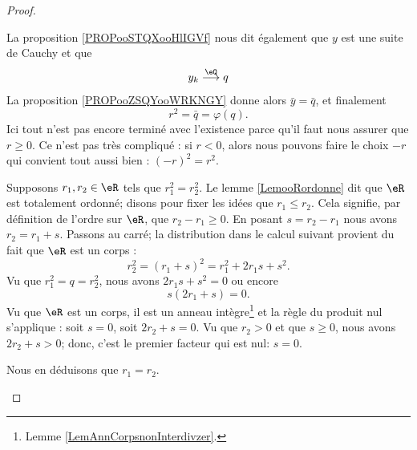 \begin{proof}
\begin{subproof}
            La proposition \ref{PROPooSTQXooHlIGVf} nous dit également que \( y\) est une suite de Cauchy et que
            \begin{equation}
                y_k\stackrel{\eQ}{\longrightarrow}q
            \end{equation}
            La proposition \ref{PROPooZSQYooWRKNGY} donne alors \( \bar y=\bar q\), et finalement
            \begin{equation}
                r^2=\bar q=\varphi(q).
            \end{equation}
            Ici tout n'est pas encore terminé avec l'existence parce qu'il faut nous assurer que \( r\geq 0\). Ce n'est pas très compliqué : si \( r<0\), alors nous pouvons faire le choix \( -r\) qui convient tout aussi bien : \( (-r)^2=r^2\).
        \item[Unicité]
            Supposons \( r_1,r_2\in \eR\) tels que \( r_1^2=r_2^2\). Le lemme \ref{LemooRordonne} dit que \( \eR\) est totalement ordonné; disons pour fixer les idées que \( r_1\leq r_2\). Cela signifie, par définition de l'ordre sur \( \eR\), que \( r_2-r_1\geq 0\). En posant \( s=r_2-r_1\) nous avons \( r_2=r_1+s\). Passons au carré; la distribution dans le calcul suivant provient du fait que \( \eR\) est un corps :
            \begin{equation}
                r_2^2=(r_1+s)^2=r_1^2+2r_1s+s^2.
            \end{equation}
            Vu que \( r_1^2=q=r_2^2\), nous avons \( 2r_1s+s^2=0\) ou encore
            \begin{equation}
                s(2r_1+s)=0.
            \end{equation}
            Vu que \( \eR\) est un corps, il est un anneau intègre\footnote{Lemme \ref{LemAnnCorpsnonInterdivzer}.} et la règle du produit nul s'applique : soit \( s=0\), soit \( 2r_2+s=0\). Vu que \( r_2>0\) et que \( s\geq 0\), nous avons \( 2r_2+s>0\); donc, c'est le premier facteur qui est nul: \( s=0\). 

            Nous en déduisons que \( r_1=r_2\).
    \end{subproof}
\end{proof}
